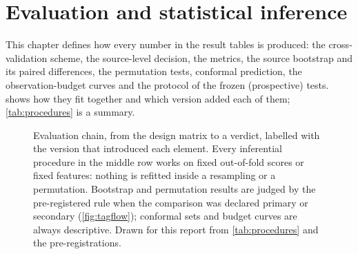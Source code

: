 \chapter{Evaluation and statistical inference}\label{ch:evaluation}

This chapter defines how every number in the result tables is produced: the cross-validation scheme, the source-level
decision, the metrics, the source bootstrap and its paired differences, the permutation tests, conformal prediction,
the observation-budget curves and the protocol of the frozen (prospective) tests.  shows how they fit
together and which version added each of them; \cref{tab:procedures} is a summary.

\begin{figure}[htbp]
\centering

\caption[Evaluation chain]{Evaluation chain, from the design matrix to a verdict, labelled with the version that introduced each
element. Every inferential procedure in the middle row works on fixed out-of-fold scores or fixed features: nothing is refitted
inside a resampling or a permutation. Bootstrap and permutation results are judged by the pre-registered rule when the comparison
was declared primary or secondary (\cref{fig:tagflow}); conformal sets and budget curves are always descriptive. Drawn for this report from \cref{tab:procedures} and the pre-registrations.}
\label{fig:evalflow}
\end{figure}

